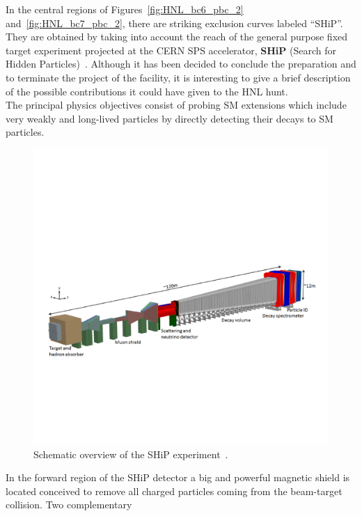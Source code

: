 
In the central regions of Figures~\ref{fig:HNL_bc6_pbc_2}
and~\ref{fig:HNL_bc7_pbc_2}, there are striking exclusion curves
labeled ``SHiP''. They are obtained by taking into account the reach of
the general purpose fixed target experiment projected at the CERN SPS
accelerator, \textbf{SHiP} (Search for Hidden Particles)~\cite{bonivento2013proposal,
  shipcollaboration2015facility}. Although it has been decided to
conclude the preparation and to terminate the project of the facility,
it is interesting to give a brief description of the possible
contributions it could have given to the HNL hunt.\\
The principal physics objectives consist of probing SM extensions
which include very weakly and long-lived particles by directly
detecting their decays to SM particles.
\begin{figure}[h!]
\centering
    \includegraphics[clip,trim=0.3cm 5cm 1.cm 7cm, width=.75\textwidth]{Figures/c7/ship.pdf}
\caption{Schematic overview of the SHiP experiment~\cite{CERN-SHiP-NOTE-2018-001}.
}
\label{fig:ship1}
\end{figure}
In the forward region of the SHiP detector a big and powerful 
magnetic shield is located conceived to remove all charged particles
coming from the beam-target collision. Two complementary
